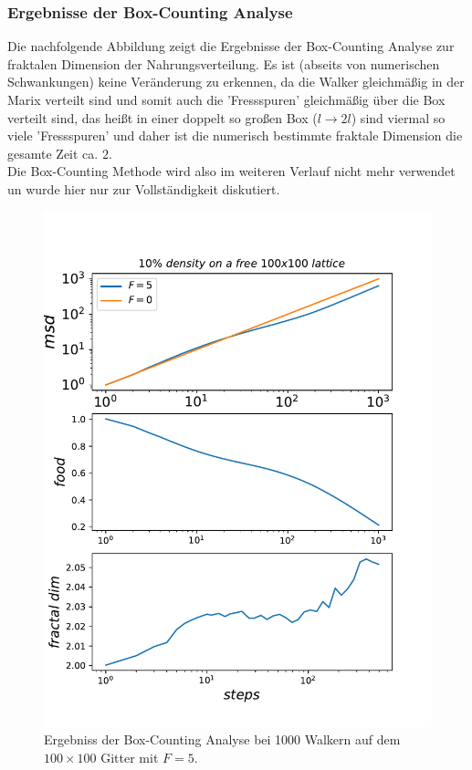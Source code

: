 \documentclass[a4paper, 12pt]{scrartcl}
\begin{document}
\newpage

\subsubsection{Ergebnisse der Box-Counting Analyse}
Die nachfolgende Abbildung zeigt die Ergebnisse der Box-Counting Analyse zur fraktalen Dimension der Nahrungsverteilung. Es ist (abseits von numerischen Schwankungen) keine Veränderung zu erkennen, da die Walker gleichmäßig in der Marix verteilt sind und somit auch die 'Fressspuren' gleichmäßig über die Box verteilt sind, das heißt in einer doppelt so großen Box ($ l \rightarrow 2l$) sind viermal so viele 'Fressspuren' und daher ist die numerisch bestimmte fraktale Dimension die gesamte Zeit ca. $2$.
\\
\noindent Die Box-Counting Methode wird also im weiteren Verlauf nicht mehr verwendet un wurde hier nur zur Vollständigkeit diskutiert. 
 
\begin{figure}[h!]
	\centering
	\includegraphics[scale=0.75]{10fractal.pdf}
	\caption{Ergebniss der Box-Counting Analyse bei 1000 Walkern auf dem $100\times 100$ Gitter mit $F=5$.}
\end{figure}
\end{document}
